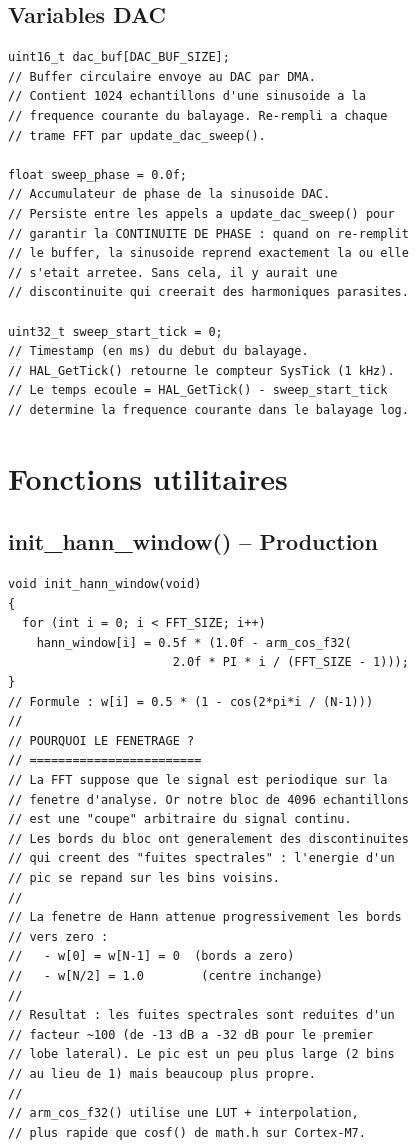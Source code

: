 \documentclass[a4paper,11pt]{article}
\begin{document}
\subsection{Variables DAC}

\begin{lstlisting}[style=cstyle,caption={Variables du g\'en\'erateur de signal DAC}]
uint16_t dac_buf[DAC_BUF_SIZE];
// Buffer circulaire envoye au DAC par DMA.
// Contient 1024 echantillons d'une sinusoide a la
// frequence courante du balayage. Re-rempli a chaque
// trame FFT par update_dac_sweep().

float sweep_phase = 0.0f;
// Accumulateur de phase de la sinusoide DAC.
// Persiste entre les appels a update_dac_sweep() pour
// garantir la CONTINUITE DE PHASE : quand on re-remplit
// le buffer, la sinusoide reprend exactement la ou elle
// s'etait arretee. Sans cela, il y aurait une
// discontinuite qui creerait des harmoniques parasites.

uint32_t sweep_start_tick = 0;
// Timestamp (en ms) du debut du balayage.
// HAL_GetTick() retourne le compteur SysTick (1 kHz).
// Le temps ecoule = HAL_GetTick() - sweep_start_tick
// determine la frequence courante dans le balayage log.
\end{lstlisting}

\newpage

\section{Fonctions utilitaires}

\subsection{init\_hann\_window() -- Production}

\begin{lstlisting}[style=cstyle,caption={Pr\'e-calcul de la fen\^etre de Hann}]
void init_hann_window(void)
{
  for (int i = 0; i < FFT_SIZE; i++)
    hann_window[i] = 0.5f * (1.0f - arm_cos_f32(
                       2.0f * PI * i / (FFT_SIZE - 1)));
}
// Formule : w[i] = 0.5 * (1 - cos(2*pi*i / (N-1)))
//
// POURQUOI LE FENETRAGE ?
// ========================
// La FFT suppose que le signal est periodique sur la
// fenetre d'analyse. Or notre bloc de 4096 echantillons
// est une "coupe" arbitraire du signal continu.
// Les bords du bloc ont generalement des discontinuites
// qui creent des "fuites spectrales" : l'energie d'un
// pic se repand sur les bins voisins.
//
// La fenetre de Hann attenue progressivement les bords
// vers zero :
//   - w[0] = w[N-1] = 0  (bords a zero)
//   - w[N/2] = 1.0        (centre inchange)
//
// Resultat : les fuites spectrales sont reduites d'un
// facteur ~100 (de -13 dB a -32 dB pour le premier
// lobe lateral). Le pic est un peu plus large (2 bins
// au lieu de 1) mais beaucoup plus propre.
//
// arm_cos_f32() utilise une LUT + interpolation,
// plus rapide que cosf() de math.h sur Cortex-M7.
\end{lstlisting}
\end{document}
